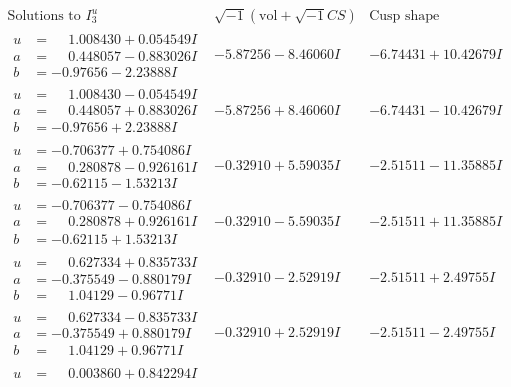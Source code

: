 \documentclass[1p]{elsarticle_modified}
\theoremstyle{definition}
\newcommand{\I}{\sqrt{-1}}
\begin{document}
$$\begin{array}{c|c|c}  
\text{Solutions to }I^u_{3}& \I (\text{vol} + \sqrt{-1}CS) & \text{Cusp shape}\\
 \hline 
\begin{aligned}
u &= \phantom{-}1.008430 + 0.054549 I \\
a &= \phantom{-}0.448057 - 0.883026 I \\
b &= -0.97656 - 2.23888 I\end{aligned}
 & -5.87256 - 8.46060 I & -6.74431 + 10.42679 I \\ \hline\begin{aligned}
u &= \phantom{-}1.008430 - 0.054549 I \\
a &= \phantom{-}0.448057 + 0.883026 I \\
b &= -0.97656 + 2.23888 I\end{aligned}
 & -5.87256 + 8.46060 I & -6.74431 - 10.42679 I \\ \hline\begin{aligned}
u &= -0.706377 + 0.754086 I \\
a &= \phantom{-}0.280878 - 0.926161 I \\
b &= -0.62115 - 1.53213 I\end{aligned}
 & -0.32910 + 5.59035 I & -2.51511 - 11.35885 I \\ \hline\begin{aligned}
u &= -0.706377 - 0.754086 I \\
a &= \phantom{-}0.280878 + 0.926161 I \\
b &= -0.62115 + 1.53213 I\end{aligned}
 & -0.32910 - 5.59035 I & -2.51511 + 11.35885 I \\ \hline\begin{aligned}
u &= \phantom{-}0.627334 + 0.835733 I \\
a &= -0.375549 - 0.880179 I \\
b &= \phantom{-}1.04129 - 0.96771 I\end{aligned}
 & -0.32910 - 2.52919 I & -2.51511 + 2.49755 I \\ \hline\begin{aligned}
u &= \phantom{-}0.627334 - 0.835733 I \\
a &= -0.375549 + 0.880179 I \\
b &= \phantom{-}1.04129 + 0.96771 I\end{aligned}
 & -0.32910 + 2.52919 I & -2.51511 - 2.49755 I \\ \hline\begin{aligned}
u &= \phantom{-}0.003860 + 0.842294 I \\

\end{aligned}
\end{array}$$
\end{document}

